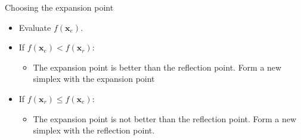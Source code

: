 \documentclass[10pt]{beamer}
\begin{document}
                                                                                              \begin{frame}{Choosing the expansion point}
                                                                                                \begin{itemize}
                                                                                                \item Evaluate $f({\bm x_e})$.

                                                                                                \item If $f({\bm x_e})<f({\bm x_r})$:
                                                                                                  \begin{itemize}
                                                                                                  \item The expansion point is better than the reflection point. Form a new simplex with the expansion point
                                                                                                  \end{itemize}

                                                                                                \item If $f({\bm x_r})\leq f({\bm x_e})$:
                                                                                                  \begin{itemize}
                                                                                                  \item The expansion point is not better than the reflection point. Form a new simplex with the reflection point.
                                                                                                  \end{itemize}
                                                                                                \end{itemize}
                                                                                              \end{frame}
\end{document}
